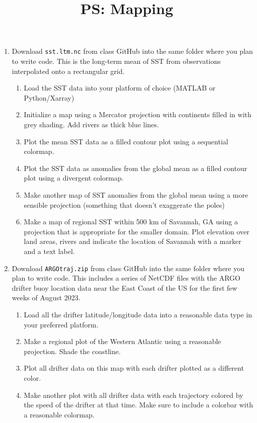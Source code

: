 \documentclass{article}
\title{\vspace{-1in} PS: Mapping}
\date{}
\newcommand{\be}{\begin{enumerate}}
\newcommand{\ee}{\end{enumerate}}
\begin{document}
\maketitle
\be 
\item Download \texttt{sst.ltm.nc} from class GitHub into the same folder where you plan to write code. This is the long-term mean of SST from observations interpolated onto a rectangular grid.

\be
\item Load the SST data into your platform of choice (MATLAB or Python/Xarray)

\item Initialize a map using a Mercator projection with continents filled in with grey shading. Add rivers as thick blue lines.

\item Plot the mean SST data as a filled contour plot using a sequential colormap.

\item Plot the SST data as anomalies from the global mean as a filled contour plot using a divergent colormap.

\item Make another map of SST anomalies from the global mean using a more sensible projection (something that doesn't exaggerate the poles)

\item Make a map of regional SST within 500 km of Savannah, GA using a projection that is appropriate for the smaller domain. Plot elevation over land areas, rivers and indicate the location of Savannah with a marker and a text label.
\ee

\item Download \texttt{ARGOtraj.zip} from class GitHub into the same folder where you plan to write code. This includes a series of NetCDF files with the ARGO drifter buoy location data near the East Coast of the US for the first few weeks of August 2023.

\be
\item Load all the drifter latitude/longitude data into a reasonable data type in your preferred platform.

\item Make a regional plot of the Western Atlantic using a reasonable projection. Shade the coastline.

\item Plot all drifter data on this map with each drifter plotted as a different color.

\item Make another plot with all drifter data with each trajectory colored by the speed of the drifter at that time. Make sure to include a colorbar with a reasonable colormap.

\ee

\ee
\end{document}
